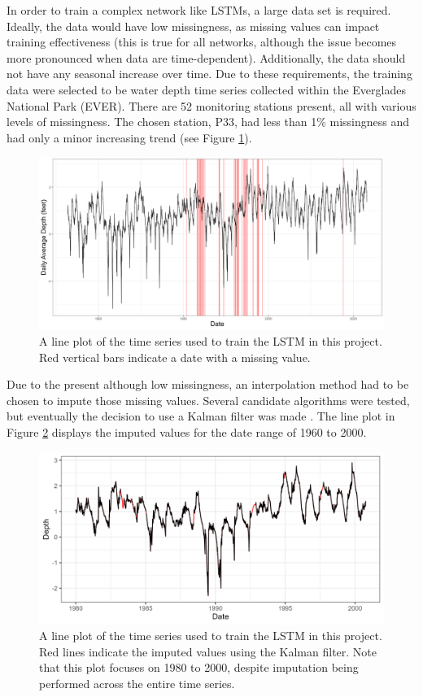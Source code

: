 In order to train a complex network like LSTMs, a large data set is required. Ideally, the data would have low missingness, as missing values can impact training effectiveness (this is true for all networks, although the issue becomes more pronounced when data are time-dependent). Additionally, the data should not have any seasonal increase over time. Due to these requirements, the training data were selected to be water depth time series collected within the Everglades National Park (EVER). There are 52 monitoring stations present, all with various levels of missingness. The chosen station, P33, had less than 1\% missingness and had only a minor increasing trend (see Figure \ref{fig:P33}).

\begin{figure}[ht]
    \centering
    \includegraphics[width=0.9\linewidth]{"Figures/P33_Time_Series_Missingness.png"}
    \caption{A line plot of the time series used to train the LSTM in this project. Red vertical bars indicate a date with a missing value.}
    \label{fig:P33}
\end{figure}

Due to the present although low missingness, an interpolation method had to be chosen to impute those missing values. Several candidate algorithms were tested, but eventually the decision to use a Kalman filter was made \citep{kalmanfilter}. The line plot in Figure \ref{fig:P33_Interpolated} displays the imputed values for the date range of 1960 to 2000.

\begin{figure}[ht]
    \centering
    \includegraphics[width=0.9\linewidth]{"Figures/Interpolation_60_20.png"}
    \caption{A line plot of the time series used to train the LSTM in this project. Red lines indicate the imputed values using the Kalman filter. Note that this plot focuses on 1980 to 2000, despite imputation being performed across the entire time series.}
    \label{fig:P33_Interpolated}
\end{figure}